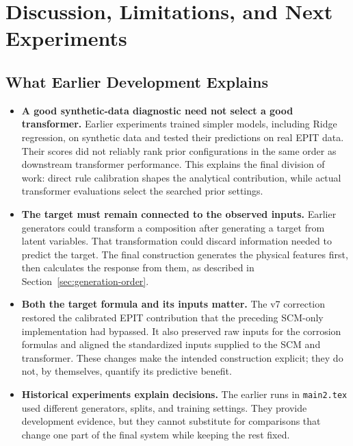 \documentclass[11pt]{article}
\newenvironment{notes}
  {\begin{itemize}\setlength{\itemsep}{0.45em}\setlength{\parsep}{0pt}}
  {\end{itemize}}
\begin{document}
\section{Discussion, Limitations, and Next Experiments}
\label{sec:discussion}

\subsection{What Earlier Development Explains}
\label{sec:development-lessons}

\begin{notes}
    \item \textbf{A good synthetic-data diagnostic need not select a good transformer.}
    Earlier experiments trained simpler models, including
    Ridge regression, on synthetic data and tested their
    predictions on real EPIT data. Their scores did not
    reliably rank prior configurations in the same order as
    downstream transformer performance.
    This explains the final division of work: direct rule
    calibration shapes the analytical contribution, while
    actual transformer evaluations select the searched
    prior settings.

    \item \textbf{The target must remain connected to the observed inputs.}
    Earlier generators could transform a composition after
    generating a target from latent variables. That
    transformation could discard information needed to
    predict the target.
    The final construction generates the physical features
    first, then calculates the response from them, as
    described in Section~\ref{sec:generation-order}.

    \item \textbf{Both the target formula and its inputs matter.}
    The v7 correction restored the calibrated EPIT contribution
    that the preceding SCM-only implementation had bypassed.
    It also preserved raw inputs for the corrosion formulas
    and aligned the standardized inputs supplied to the SCM
    and transformer. These changes make the intended
    construction explicit; they do not, by themselves,
    quantify its predictive benefit.

    \item \textbf{Historical experiments explain decisions.}
    The earlier runs in \texttt{main2.tex} used different
    generators, splits, and training settings.
    They provide development evidence, but they cannot
    substitute for comparisons that change one part of the
    final system while keeping the rest fixed.
\end{notes}
\end{document}
